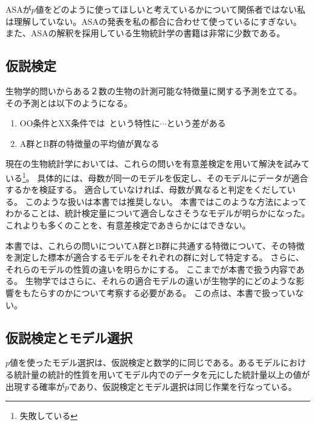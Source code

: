 
ASAが$p$値をどのように使ってほしいと考えているかについて関係者ではない私は理解していない。ASAの発表を私の都合に合わせて使っているにすぎない。
また、ASAの解釈を採用している生物統計学の書籍は非常に少数である。

\subsection{仮説検定}
生物学的問いからある２数の生物の計測可能な特徴量に関する予測を立てる。
その予測とは以下のようになる。
\begin{enumerate}
 \item OO条件とXX条件では~という特性に$\cdots$という差がある
 \item A群とB群の特徴量の平均値が異なる
\end{enumerate}
現在の生物統計学においては、これらの問いを有意差検定を用いて解決を試みている\footnote{失敗している}。
具体的には、母数が同一のモデルを仮定し、そのモデルにデータが適合するかを検証する。
適合していなければ、母数が異なると判定をくだしている。
このような扱いは本書では推奨しない。
本書ではこのような方法によってわかることは、統計検定量について適合しなさそうなモデルが明らかになった。
これよりも多くのことを、有意差検定であきらかにはできない。

本書では、これらの問いについてA群とB群に共通する特徴について、その特徴を測定した標本が適合するモデルをそれぞれの群に対して特定する。
さらに、それらのモデルの性質の違いを明らかにする。
ここまでが本書で扱う内容である。
生物学ではさらに、それらの適合モデルの違いが生物学的にどのような影響をもたらすのかについて考察する必要がある。
この点は、本書で扱っていない。


\subsection{仮説検定とモデル選択}
$p$値を使ったモデル選択は、仮説検定と数学的に同じである。あるモデルにおける統計量の統計的性質を用いてモデル内でのデータを元にした統計量以上の値が出現する確率が$p$であり、仮説検定とモデル選択は同じ作業を行なっている。

